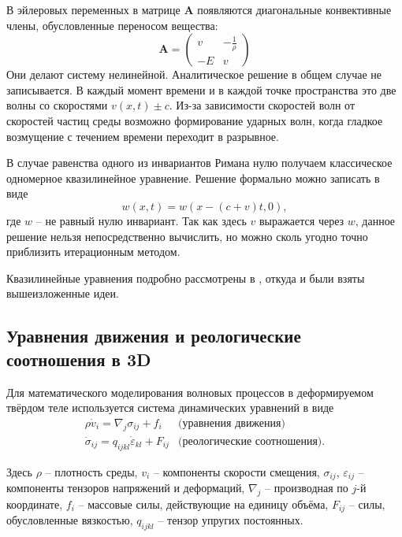 В эйлеровых переменных в матрице $\mathbf{A}$ появляются диагональные конвективные члены, обусловленные переносом вещества:
\begin{displaymath}
\mathbf{A} =
\left( \begin{array}{cc}
v & -\frac{1}{\rho} \\
-E & v
\end{array} \right)
\end{displaymath} 
Они делают систему нелинейной. Аналитическое решение в общем случае не записывается. В каждый момент времени и в каждой точке пространства это две волны со скоростями $v(x,t) \pm c$. Из-за зависимости скоростей волн от скоростей частиц среды возможно формирование ударных волн, когда гладкое возмущение с течением времени переходит в разрывное.

В случае равенства одного из инвариантов Римана нулю получаем классическое одномерное квазилинейное уравнение. Решение формально можно записать в виде
\begin{equation}
w(x,t) = w(x - (c + v)t,0),
\label{quazilin}
\end{equation}
где $w$ -- не равный нулю инвариант. Так как здесь $v$ выражается через $w$, данное решение нельзя  непосредственно вычислить, но можно сколь угодно точно приблизить итерационным методом. 

Квазилинейные уравнения подробно рассмотрены в \cite{rogdestvenskiy}, откуда и были взяты вышеизложенные идеи.

\subsection{Уравнения движения и реологические соотношения в 3D}
Для математического моделирования волновых процессов в деформируемом твёрдом
теле используется система динамических уравнений \cite{sedov} в виде
\begin{eqnarray}
\label{rheology_equations}
\rho\dot{v}_i=\nabla_j\sigma_{ij}+f_i & \textrm{(уравнения движения)}\nonumber\\
\dot{\sigma}_{ij}=q_{ijkl}\dot{\varepsilon}_{kl}+F_{ij} & \textrm{(реологические
соотношения).}
\end{eqnarray}

Здесь $\rho$ – плотность среды, $v_i$ – компоненты скорости смещения,
$\sigma_{ij}$, $\varepsilon_{ij}$ -- компоненты тензоров напряжений и деформаций,
$\nabla_j$ – производная по $j$-й координате, $f_i$ – массовые
силы, действующие на единицу объёма, $F_{ij}$ -- силы, обусловленные вязкостью, $q_{ijkl}$ -- 
тензор упругих постоянных.

